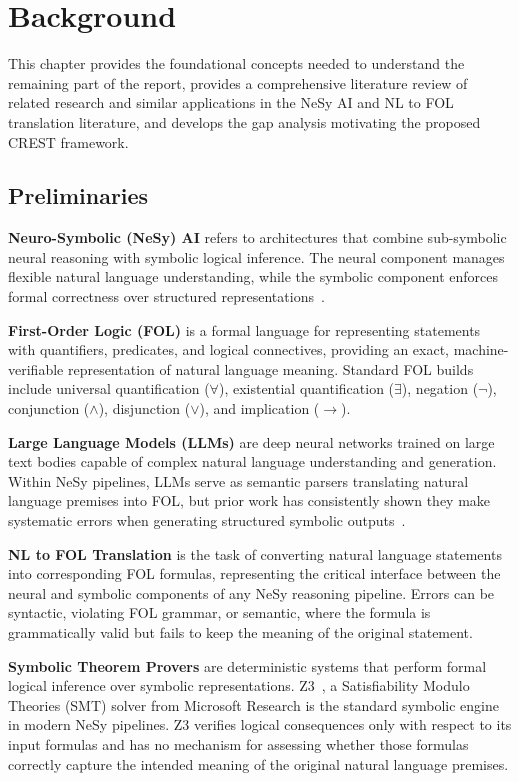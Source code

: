 \chapter{Background}

This chapter provides the foundational concepts needed to understand the remaining part of the report, provides a comprehensive literature review of related research and similar applications in the NeSy AI and NL to FOL translation literature, and develops the gap analysis motivating the proposed CREST framework.

\section{Preliminaries}

\textbf{Neuro-Symbolic (NeSy) AI} refers to architectures that combine sub-symbolic neural reasoning with symbolic logical inference. The neural component manages flexible natural language understanding, while the symbolic component enforces formal correctness over structured representations~\cite{colelough2025nesyreview}.

\textbf{First-Order Logic (FOL)} is a formal language for representing statements with quantifiers, predicates, and logical connectives, providing an exact, machine-verifiable representation of natural language meaning. Standard FOL builds include universal quantification ($\forall$), existential quantification ($\exists$), negation ($\neg$), conjunction ($\wedge$), disjunction ($\vee$), and implication ($\rightarrow$).

\textbf{Large Language Models (LLMs)} are deep neural networks trained on large text bodies capable of complex natural language understanding and generation. Within NeSy pipelines, LLMs serve as semantic parsers translating natural language premises into FOL, but prior work has consistently shown they make systematic errors when generating structured symbolic outputs~\cite{yang2024harnessing, thatikonda2024strategies}.

\textbf{NL to FOL Translation} is the task of converting natural language statements into corresponding FOL formulas, representing the critical interface between the neural and symbolic components of any NeSy reasoning pipeline. Errors can be syntactic, violating FOL grammar, or semantic, where the formula is grammatically valid but fails to keep the meaning of the original statement.

\textbf{Symbolic Theorem Provers} are deterministic systems that perform formal logical inference over symbolic representations. Z3~\cite{demoura2008z3}, a Satisfiability Modulo Theories (SMT) solver from Microsoft Research is the standard symbolic engine in modern NeSy pipelines. Z3 verifies logical consequences only with respect to its input formulas and has no mechanism for assessing whether those formulas correctly capture the intended meaning of the original natural language premises.

